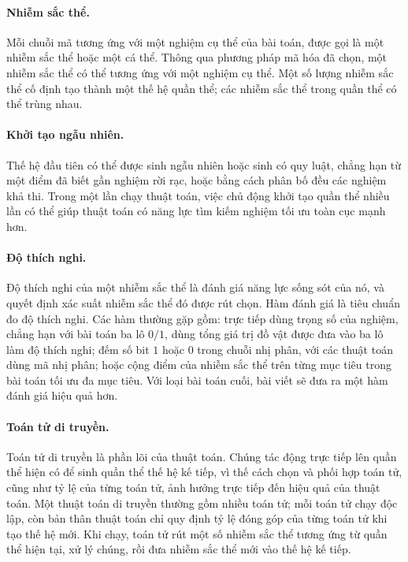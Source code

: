 \documentclass[11pt]{article}
\begin{document}
\paragraph{Nhiễm sắc thể.}
Mỗi chuỗi mã tương ứng với một nghiệm cụ thể của bài toán, được gọi là một
nhiễm sắc thể hoặc một cá thể. Thông qua phương pháp mã hóa đã chọn, một nhiễm
sắc thể có thể tương ứng với một nghiệm cụ thể. Một số lượng nhiễm sắc thể cố
định tạo thành một thế hệ quần thể; các nhiễm sắc thể trong quần thể có thể
trùng nhau.

\paragraph{Khởi tạo ngẫu nhiên.}
Thế hệ đầu tiên có thể được sinh ngẫu nhiên hoặc sinh có quy luật, chẳng hạn
từ một điểm đã biết gần nghiệm rời rạc, hoặc bằng cách phân bố đều các nghiệm
khả thi. Trong một lần chạy thuật toán, việc chủ động khởi tạo quần thể nhiều
lần có thể giúp thuật toán có năng lực tìm kiếm nghiệm tối ưu toàn cục mạnh
hơn.

\paragraph{Độ thích nghi.}
Độ thích nghi của một nhiễm sắc thể là đánh giá năng lực sống sót của nó, và
quyết định xác suất nhiễm sắc thể đó được rút chọn. Hàm đánh giá là tiêu chuẩn
đo độ thích nghi. Các hàm thường gặp gồm: trực tiếp dùng trọng số của nghiệm,
chẳng hạn với bài toán ba lô \(0/1\), dùng tổng giá trị đồ vật được đưa vào ba
lô làm độ thích nghi; đếm số bit \(1\) hoặc \(0\) trong chuỗi nhị phân, với các
thuật toán dùng mã nhị phân; hoặc cộng điểm của nhiễm sắc thể trên từng mục
tiêu trong bài toán tối ưu đa mục tiêu. Với loại bài toán cuối, bài viết sẽ
đưa ra một hàm đánh giá hiệu quả hơn.

\paragraph{Toán tử di truyền.}
Toán tử di truyền là phần lõi của thuật toán. Chúng tác động trực tiếp lên
quần thể hiện có để sinh quần thể thế hệ kế tiếp, vì thế cách chọn và phối hợp
toán tử, cũng như tỷ lệ của từng toán tử, ảnh hưởng trực tiếp đến hiệu quả của
thuật toán. Một thuật toán di truyền thường gồm nhiều toán tử; mỗi toán tử
chạy độc lập, còn bản thân thuật toán chỉ quy định tỷ lệ đóng góp của từng
toán tử khi tạo thế hệ mới. Khi chạy, toán tử rút một số nhiễm sắc thể tương
ứng từ quần thể hiện tại, xử lý chúng, rồi đưa nhiễm sắc thể mới vào thế hệ
kế tiếp.
\end{document}
